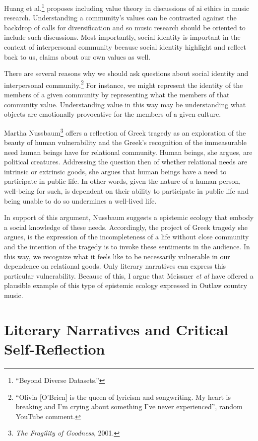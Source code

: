 \documentclass[phdthesis,12pt,final]{wuthesis}
\theoremstyle{definition}
\theoremstyle{definition}
\theoremstyle{definition}
\theoremstyle{definition}
\theoremstyle{remark}
\begin{document}
Huang et al.\footnote{{``Beyond {Diverse Datasets}.''}} proposes including value theory in discussions of ai ethics in music research. Understanding a community's values can be contrasted against the backdrop of calls for diversification and so music research should be oriented to include such discussions. Most importantly, social identity is important in the context of interpersonal community because social identity highlight and reflect back to us, claims about our own values as well.

There are several reasons why we should ask questions about social identity and interpersonal community.\footnote{``Olivia {[}O'Brien{]} is the queen of lyricism and songwriting. My heart is breaking and I'm crying about something I've never experienced'', random YouTube comment.} For instance, we might represent the identity of the members of a given community by representing what the members of that community value. Understanding value in this way may be understanding what objects are emotionally provocative for the members of a given culture.

Martha Nussbaum\footnote{\emph{The {Fragility} of {Goodness}}, 2001.} offers a reflection of Greek tragedy as an exploration of the beauty of human vulnerability and the Greek's recognition of the immeasurable need human beings have for relational community. Human beings, she argues, are political creatures. Addressing the question then of whether relational needs are intrinsic or extrinsic goods, she argues that human beings have a need to participate in public life. In other words, given the nature of a human person, well-being for such, is dependent on their ability to participate in public life and being unable to do so undermines a well-lived life.

In support of this argument, Nussbaum suggests a epistemic ecology that embody a social knowledge of these needs. Accordingly, the project of Greek tragedy she argues, is the expression of the incompleteness of a life without close community and the intention of the tragedy is to invoke these sentiments in the audience. In this way, we recognize what it feels like to be necessarily vulnerable in our dependence on relational goods. Only literary narratives can express this particular vulnerability. Because of this, I argue that Meissner \emph{et al} have offered a plausible example of this type of epistemic ecology expressed in Outlaw country music.

\section{Literary Narratives and Critical Self-Reflection}\label{literary-narratives-and-critical-self-reflection}
\end{document}
